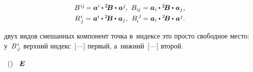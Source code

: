 \begin{otherlanguage}{russian}
\begin{equation}
\begin{array}{c}
%
\somebivalenttensorcomponentsupper{i\hspace{-0.1ex}j} \hspace{-0.25ex} = \bm{a}^{\hspace{-0.05ex}i} \dotp \somebivalenttensor \dotp \hspace{.1ex} \bm{a}^{\hspace{.05ex}j} \hspace{-0.2ex}, \:\,
\somebivalenttensorcomponents{i\hspace{-0.1ex}j} = \bm{a}_i \dotp \somebivalenttensor \dotp \hspace{.1ex} \bm{a}_j \hspace{.1ex}, \\[0.25em]
%
\somebivalenttensorcomponents{\hspace{-0.2ex} \cdot j}^{\hspace{.1ex}i} = \bm{a}^{\hspace{-0.05ex}i} \dotp \somebivalenttensor \dotp \hspace{.1ex} \bm{a}_j \hspace{.1ex}, \:\,
\somebivalenttensorcomponents{\hspace{-0.1ex}i}^{\hspace{-0.05ex} \cdot j} \hspace{-0.2ex} = \bm{a}_i \dotp \somebivalenttensor \dotp \hspace{.1ex} \bm{a}^{\hspace{.1ex}j} \hspace{-0.1ex}.
\end{array}\end{equation}

\vspace{-0.1em}\noindent
{}
двух видов
смешанных компонент
точка в~индексе это просто свободное место:
у~${ B_{\hspace{-0.2ex} \cdot j}^{\hspace{.1ex}i} }$
верхний индекс~[---]
первый,
а~ниж\-ний~[---]
второй.

~()
~$\bm{E}$


\end{otherlanguage}
